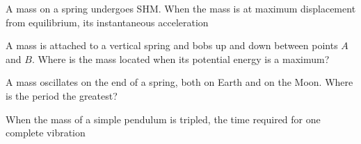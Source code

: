 \documentclass{ximera}
\begin{document}
\begin{interactive}[interactiveContent.js]
\begin{question}
A mass on a spring undergoes SHM. When the mass is at maximum displacement from equilibrium, its instantaneous acceleration
\begin{solution}
\begin{multiple-choice}
\end{multiple-choice}
\end{solution}
\end{question}

\begin{question}
A mass is attached to a vertical spring and bobs up and down between points $A$ and $B$. Where is the mass located when its potential
energy is a maximum?
\begin{solution}
\begin{multiple-choice}
\end{multiple-choice}
\end{solution}
\end{question}

\begin{question}
A mass oscillates on the end of a spring, both on Earth and on the Moon. Where is the period the greatest?
\begin{solution}
\begin{multiple-choice}
\end{multiple-choice}
\end{solution}
\end{question}

\begin{question}
When the mass of a simple pendulum is tripled, the time required for one complete vibration
\begin{solution}
\begin{multiple-choice}
\end{multiple-choice}
\end{solution}
\end{question}


\end{interactive}
\end{document}

